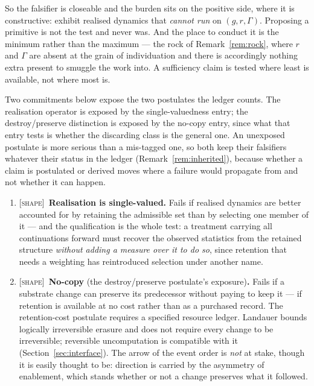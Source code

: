 \documentclass[11pt,a4paper]{article}
\theoremstyle{remark}\newtheorem{remark}[definition]{Remark}
\begin{document}
So the falsifier is closeable and the burden sits on the positive side, where it is constructive: exhibit realised dynamics that \emph{cannot run} on $(g,r,\Gamma)$. Proposing a primitive is not the test and never was. And the place to conduct it is the minimum rather than the maximum --- the rock of Remark~\ref{rem:rock}, where $r$ and $\Gamma$ are absent at the grain of individuation and there is accordingly nothing extra present to smuggle the work into. A sufficiency claim is tested where least is available, not where most is.

Two commitments below expose the two postulates the ledger counts. The realisation operator is
exposed by the single-valuedness entry; the destroy\slash preserve distinction is exposed by the
no-copy entry, since what that entry tests is whether the discarding class is the general one. An
unexposed postulate is more serious than a mis-tagged one, so both keep their
falsifiers whatever their status in the ledger (Remark~\ref{rem:inherited}), because whether a claim
is postulated or derived moves where a failure would propagate from and not whether it can happen.

\begin{enumerate}[leftmargin=*,resume]
\item \textsc{[shape]}~\textbf{Realisation is single-valued.} Fails if realised dynamics are better accounted for by retaining the admissible set than by selecting one member of it --- and the qualification is the whole test: a treatment carrying all continuations forward must recover the observed statistics from the retained structure \emph{without adding a measure over it to do so}, since retention that needs a weighting has reintroduced selection under another name.
\item \textsc{[shape]}~\textbf{No-copy} (the destroy\slash preserve postulate's exposure)\textbf{.} Fails if a substrate change can preserve its predecessor
without paying to keep it --- if retention is available at no cost rather than as a purchased record.
The retention-cost postulate requires a specified resource ledger. Landauer bounds logically irreversible erasure and does not require every change to be irreversible; reversible uncomputation is compatible with it (Section~\ref{sec:interface}). The arrow of the event order is \emph{not} at stake, though it is
easily thought to be: direction is carried by the asymmetry of enablement, which stands
whether or not a change preserves what it followed.
\end{enumerate}
\end{document}
